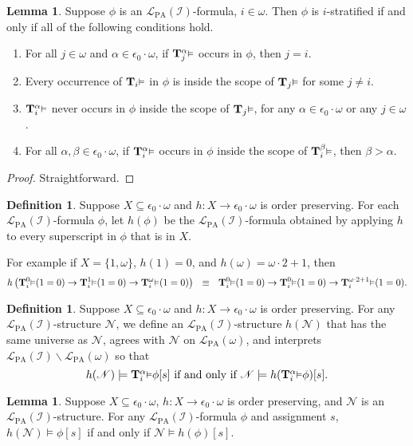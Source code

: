 \documentclass[reqno]{article}
\theoremstyle{definition}
\newtheorem{lemma}[theorem]{Lemma}
\newtheorem{definition}[theorem]{Definition}
\def\L{\mathscr{L}}
\def\T{\mathbf{T}}
\def\LPA{\L_{\mathrm{PA}}}
\def\epom{\epsilon_0\cdot\omega}
\def\indset{\mathcal I}
\renewcommand{\Pr}[1]{\T_{#1}\mbox{\small${\vDash}$}}
\newcommand{\Prr}[2]{\T^{#1}_{#2}\mbox{\small${\vDash}$}}
\begin{document}
\begin{lemma}
Suppose $\phi$ is an $\LPA(\indset)$-formula, $i\in\omega$.
Then $\phi$ is $i$-stratified if and only if all of the following conditions hold.
\begin{enumerate}
    \item
    For all $j\in\omega$ and $\alpha\in\epom$, if $\Prr\alpha j$ occurs in $\phi$,
    then $j=i$.
    \item
    Every occurrence of $\Pr i$ in $\phi$ is inside the scope of $\Pr j$ for some
    $j\not=i$.
    \item
    $\Prr\alpha i$ never occurs in $\phi$ inside the scope of $\Pr j$, for any
    $\alpha\in\epom$ or any $j\in\omega$.
    \item
    For all $\alpha,\beta\in\epom$,
    if $\Prr\alpha i$ occurs in $\phi$ inside the scope of $\Prr\beta i$,
    then $\beta>\alpha$.
\end{enumerate}
\end{lemma}

\begin{proof}
Straightforward.
\end{proof}

\begin{definition}
Suppose $X\subseteq\epom$ and $h:X\to \epom$ is order preserving.
For each $\LPA(\indset)$-formula $\phi$,
let $h(\phi)$ be the $\LPA(\indset)$-formula obtained by applying $h$ to every superscript in $\phi$
that is in $X$.
\end{definition}

For example if $X=\{1,\omega\}$, $h(1)=0$, and $h(\omega)=\omega\cdot 2+1$,
then
\[
h\left(\Prr0i(1=0)\rightarrow\Prr1i(1=0)\rightarrow\Prr{\omega} i(1=0)\right)
\,\,\,\,\equiv\,\,\,\,
\Prr0i(1=0)\rightarrow\Prr0i(1=0)\rightarrow\Prr{\omega\cdot 2+1}i(1=0).
\]


\begin{definition}
Suppose $X\subseteq\epom$ and $h:X\to\epom$ is order preserving.
For any $\LPA(\indset)$-structure $\mathscr N$,
we define an $\LPA(\indset)$-structure $h(\mathscr N)$ that
has the same universe as $\mathscr N$,
agrees with $\mathscr N$ on $\LPA(\omega)$, and
interprets $\LPA(\indset)\backslash\LPA(\omega)$
so that
\[
\mbox{$h(\mathscr N)\models \Prr\alpha i\phi[s]$
if and only if $\mathscr N\models h(\Prr\alpha i\phi)[s]$.}
\]
\end{definition}

\begin{lemma}
\label{hcommutativitylemma}
Suppose $X\subseteq\epom$, $h:X\to\epom$ is order preserving,
and $\mathscr N$ is an $\LPA(\indset)$-structure.
For any $\LPA(\indset)$-formula $\phi$
and assignment $s$,
$h(\mathscr N)\models\phi[s]$
if and only if $\mathscr N\models h(\phi)[s]$.
\end{lemma}
\end{document}
